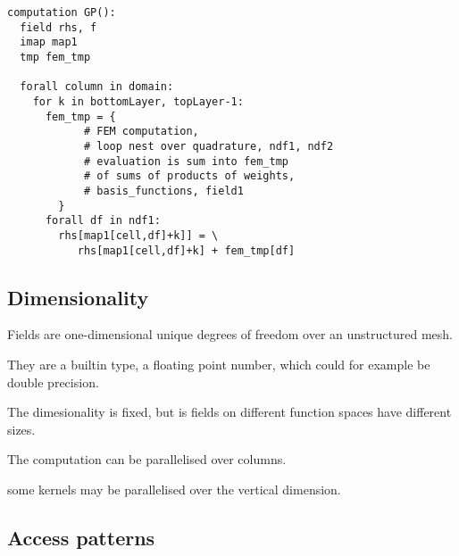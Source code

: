 \documentclass[a4]{article}
\begin{document}
\begin{lstlisting}[style=dsl]
computation GP():
  field rhs, f
  imap map1
  tmp fem_tmp

  forall column in domain:
    for k in bottomLayer, topLayer-1:
      fem_tmp = {
            # FEM computation, 
            # loop nest over quadrature, ndf1, ndf2
            # evaluation is sum into fem_tmp
            # of sums of products of weights, 
            # basis_functions, field1
        }
      forall df in ndf1:
        rhs[map1[cell,df]+k]] = \ 
           rhs[map1[cell,df]+k] + fem_tmp[df]

\end{lstlisting}
\subsection{Dimensionality}
\begin{enumeration}
  \item Fields are one-dimensional unique degrees of freedom over an unstructured mesh.
  \item They are a builtin type, a floating point number, which could for example be double precision.
   \item The dimesionality is fixed, but is fields on different function spaces have different sizes.
   \item The computation can be parallelised over columns. 
   \item some kernels may be parallelised over the vertical dimension.
\end{enumeration}

\subsection{Access patterns}
  
\end{document}
